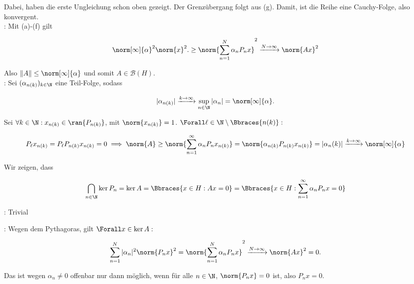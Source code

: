 \begin{solution}
Dabei, haben die erste Ungleichung schon oben gezeigt.
Der Grenzübergang folgt aus (g).
Damit, ist die Reihe eine Cauchy-Folge, also konvergent. \\

:
Mit (a)-(f) gilt

\begin{align*}
    \norm[\infty]{\alpha}^2 \norm{x}^2.
    \geq
    \norm{\sum_{n = 1}^N \alpha_n P_n x}^2
    \xrightarrow{N \to \infty}
    \norm{A x}^2
\end{align*}

Also $\|A\| \leq \norm[\infty]{\alpha}$ und somit $A \in \mathcal{B}(H)$. \\

:
Sei $(\alpha_{n(k)})_{k \in \N}$ eine Teil-Folge, sodass

\begin{align*}
  |\alpha_{n(k)}|
  \xrightarrow{k \to \infty}
  \sup_{n \in \N} |\alpha_n|
  =
  \norm[\infty]{\alpha}.
\end{align*}

Sei $\forall k \in \N: x_{n(k)} \in \ran{P_{n(k)}}$, mit $\norm{x_{n(k)}} = 1$.
$\Forall \ell \in \N \setminus \Bbraces{n(k)}:$

\begin{align*}
  P_\ell x_{n(k)} = P_\ell P_{n(k)} x_{n(k)} = 0
  \implies
  \norm{A}
  \geq
  \norm{\sum_{n=1}^\infty \alpha_n P_n x_{n(k)}}
  =
  \norm{\alpha_{n(k)} P_{n(k)} x_{n(k)}}
  =
  |\alpha_n(k)|
  \xrightarrow{k \to \infty}
  \norm[\infty]{\alpha}
\end{align*}

Wir zeigen, dass

\begin{align*}
  \bigcap_{n \in \N} \ker{P_n}
  =
  \ker{A}
  =
  \Bbraces{x \in H: A x = 0}
  =
  \Bbraces{x \in H: \sum_{n=1}^\infty \alpha_n P_n x = 0}
\end{align*}

\Quote{$\subseteq$}:
Trivial

\Quote{$\supseteq$}:
Wegen dem Pythagoras, gilt $\Forall x \in \ker{A}:$

\begin{align*}
    \sum_{n=1}^N |\alpha_n|^2 \norm{P_n x}^2
    =
    \norm{\sum_{n = 1}^N \alpha_n P_n x}^2
    \xrightarrow{N \rightarrow \infty}
    \norm{A x}^2 = 0.
\end{align*}

Das ist wegen $\alpha_n \neq 0$ offenbar nur dann möglich, wenn für alle $n \in \N$, $\norm{P_n x} = 0$ ist, also $P_n x = 0$. \\


\end{solution}
